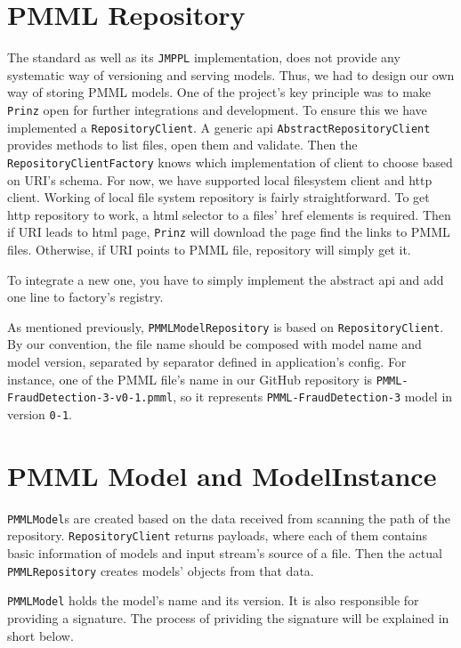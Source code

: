 \section{PMML Repository}

The standard as well as its \texttt{JMPPL} implementation, does not provide any systematic way of versioning and serving models.
Thus, we had to design our own way of storing PMML models. One of the project’s key principle was
to make \texttt{Prinz} open for further integrations and development. To ensure this we have implemented a \texttt{RepositoryClient}.
A generic api \texttt{AbstractRepositoryClient} provides methods to list files, open them and validate. Then the \texttt{RepositoryClientFactory}
knows which implementation of client to choose based on URI’s schema. For now, we have supported local filesystem client and http client.
Working of local file system repository is fairly straightforward. To get http repository to work, a html selector to a files' href elements
is required. Then if URI leads to html page, \texttt{Prinz} will download the page find the links to PMML files. Otherwise, if URI points
to PMML file, repository will simply get it.

To integrate a new one, you have to simply implement the abstract api and add one line to factory’s registry.

As mentioned previously, \texttt{PMMLModelRepository} is based on \texttt{RepositoryClient}. By our convention,
the file name should be composed with model name and model version, separated by separator defined in application’s config.
For instance, one of the PMML file's name in our GitHub repository is \texttt{PMML-FraudDetection-3-v0-1.pmml}, so it represents
\texttt{PMML-FraudDetection-3} model in version \texttt{0-1}.

\section{PMML Model and ModelInstance}

\texttt{PMMLModel}s are created based on the data received from scanning the path of the repository.
\texttt{RepositoryClient} returns payloads, where each of them contains basic information of models and input stream's source of a file.
Then the actual \texttt{PMMLRepository} creates models’ objects from that data.

\texttt{PMMLModel} holds the model’s name and its version. It is also responsible for providing a signature. The process of prividing the signature will
be explained in short below.

